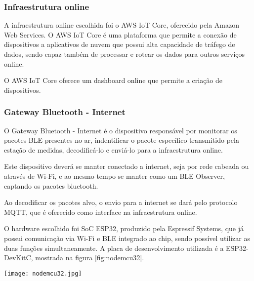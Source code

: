 
\subsubsection{Infraestrutura online}

A infraestrutura online escolhida foi o AWS IoT Core, oferecido pela Amazon Web
Services. O AWS IoT Core é uma plataforma que permite a conexão de dispositivos
a aplicativos de nuvem que possui alta capacidade de tráfego de dados, sendo
capaz também de processar e rotear os dados para outros serviços online.
\cite{AWS_IoTCore}


O AWS IoT Core oferece um dashboard online que permite a criação de dispositivos.


\subsubsection{Gateway Bluetooth - Internet}


O Gateway Bluetooth - Internet é o dispositivo responsável por monitorar os
pacotes BLE presentes no ar, indentificar o pacote específico transmitido pela
estação de medidas, decodificá-lo e enviá-lo para a infraestrutura online.

Este dispositivo deverá se manter conectado a internet, seja por rede cabeada
ou através de Wi-Fi, e ao mesmo tempo se manter como um BLE Observer, captando os
pacotes bluetooth.

Ao decodificar os pacotes alvo, o envio para a internet se dará pelo protocolo MQTT,
que é oferecido como interface na infraestrutura online.


O hardware escolhido foi SoC ESP32, produzido pela Espressif Systems, que já possui
comunicação via Wi-Fi e BLE integrado ao chip, sendo possível utilizar as duas funções
simultaneamente. A placa de desenvolvimento utilizada é a ESP32-DevKitC,
mostrada na figura \ref{fig:nodemcu32}.\cite{ESP32Datasheet}

\begin{center}
	\centering 
	\texttt{[image: nodemcu32.jpg]}
	\label{fig:nodemcu32}
\end{center} 

